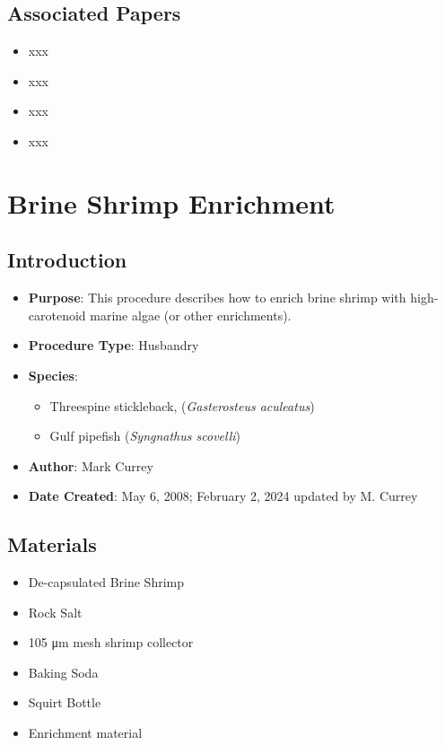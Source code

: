 \documentclass[
  letterpaper,
  DIV=11,
  numbers=noendperiod]{scrreprt}
\providecommand{\tightlist}{%
  \setlength{\itemsep}{0pt}\setlength{\parskip}{0pt}}\usepackage{longtable,booktabs,array}
\begin{document}
\hypertarget{associated-papers-2}{%
\section{Associated Papers}\label{associated-papers-2}}

\begin{itemize}
\tightlist
\item
  xxx
\item
  xxx
\item
  xxx
\item
  xxx
\end{itemize}

\hypertarget{sec-husb-enrich_brineshrimp}{%
\chapter{Brine Shrimp Enrichment}\label{sec-husb-enrich_brineshrimp}}

\hypertarget{introduction-9}{%
\section{Introduction}\label{introduction-9}}

\begin{itemize}
\tightlist
\item
  \textbf{Purpose}: This procedure describes how to enrich brine shrimp
  with high-carotenoid marine algae (or other enrichments).
\item
  \textbf{Procedure Type}: Husbandry
\item
  \textbf{Species}:

  \begin{itemize}
  \tightlist
  \item
    Threespine stickleback, (\emph{Gasterosteus aculeatus})
  \item
    Gulf pipefish (\emph{Syngnathus scovelli})
  \end{itemize}
\item
  \textbf{Author}: Mark Currey
\item
  \textbf{Date Created}: May 6, 2008; February 2, 2024 updated by M.
  Currey
\end{itemize}

\hypertarget{materials-9}{%
\section{Materials}\label{materials-9}}

\begin{itemize}
\tightlist
\item
  De-capsulated Brine Shrimp
\item
  Rock Salt
\item
  105 μm mesh shrimp collector
\item
  Baking Soda
\item
  Squirt Bottle
\item
  Enrichment material
\end{itemize}
\end{document}
